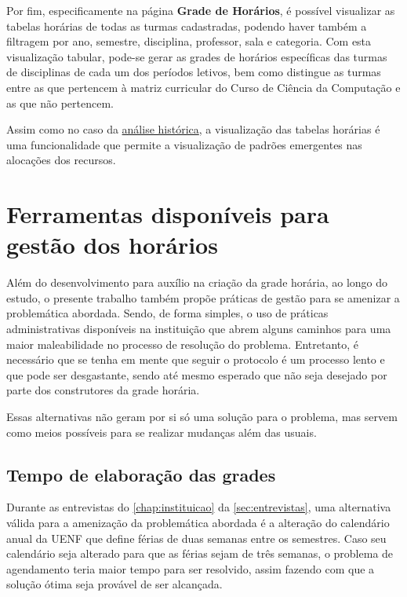 Por fim, especificamente na página \textbf{Grade de Horários}, é possível visualizar as tabelas horárias de todas as turmas cadastradas, podendo haver também a filtragem por ano, semestre, disciplina, professor, sala e categoria. Com esta visualização tabular, pode-se gerar as grades de horários específicas das turmas de disciplinas de cada um dos períodos letivos, bem como distingue as turmas entre as que pertencem à matriz curricular do Curso de Ciência da Computação e as que não pertencem.

Assim como no caso da \hyperref[sssec:Análise histórica]{análise histórica}, a visualização das tabelas horárias é uma funcionalidade que permite a visualização de padrões emergentes nas alocações dos recursos.

\section{Ferramentas disponíveis para gestão dos horários} %

Além do desenvolvimento para auxílio na criação da grade horária, ao longo do estudo, o presente trabalho também propõe práticas de gestão para se amenizar a problemática abordada. Sendo, de forma simples, o uso de práticas administrativas disponíveis na instituição que abrem alguns caminhos para uma maior maleabilidade no processo de resolução do problema. Entretanto, é necessário que se tenha em mente que seguir o protocolo é um processo lento e que pode ser desgastante, sendo até mesmo esperado que não seja desejado por parte dos construtores da grade horária.

Essas alternativas não geram por si só uma solução para o problema, mas servem como meios possíveis para se realizar mudanças além das usuais.

\subsection{Tempo de elaboração das grades} \label{ssec:burocracia-férias} %

Durante as entrevistas do \autoref{chap:instituicao} da \autoref{sec:entrevistas}, uma alternativa válida para a amenização da problemática abordada é a alteração do calendário anual da UENF que define férias de duas semanas entre os semestres. Caso seu calendário seja alterado para que as férias sejam de três semanas, o problema de agendamento teria maior tempo para ser resolvido, assim fazendo com que a solução ótima seja provável de ser alcançada.

